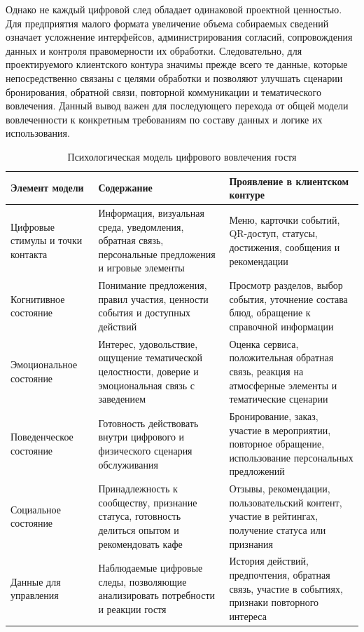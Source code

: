 Однако не каждый цифровой след обладает одинаковой проектной ценностью. Для предприятия малого формата увеличение объема собираемых сведений означает усложнение интерфейсов, администрирования согласий, сопровождения данных и контроля правомерности их обработки. Следовательно, для проектируемого клиентского контура значимы прежде всего те данные, которые непосредственно связаны с целями обработки и позволяют улучшать сценарии бронирования, обратной связи, повторной коммуникации и тематического вовлечения. Данный вывод важен для последующего перехода от общей модели вовлеченности к конкретным требованиям по составу данных и логике их использования.

\begin{table}[H]
\centering
\small
\caption{Психологическая модель цифрового вовлечения гостя}
\label{tab:psychological_engagement_model}
\begin{tabularx}{\textwidth}{|>{\raggedright\arraybackslash}p{}|>{\raggedright\arraybackslash}p{}|>{\raggedright\arraybackslash}X|}
\hline
\textbf{Элемент модели} & \textbf{Содержание} & \textbf{Проявление в клиентском контуре} \\ \hline
Цифровые стимулы и точки контакта & Информация, визуальная среда, уведомления, обратная связь, персональные предложения и игровые элементы & Меню, карточки событий, QR-доступ, статусы, достижения, сообщения и рекомендации \\ \hline
Когнитивное состояние & Понимание предложения, правил участия, ценности события и доступных действий & Просмотр разделов, выбор события, уточнение состава блюд, обращение к справочной информации \\ \hline
Эмоциональное состояние & Интерес, удовольствие, ощущение тематической целостности, доверие и эмоциональная связь с заведением & Оценка сервиса, положительная обратная связь, реакция на атмосферные элементы и тематические сценарии \\ \hline
Поведенческое состояние & Готовность действовать внутри цифрового и физического сценария обслуживания & Бронирование, заказ, участие в мероприятии, повторное обращение, использование персональных предложений \\ \hline
Социальное состояние & Принадлежность к сообществу, признание статуса, готовность делиться опытом и рекомендовать кафе & Отзывы, рекомендации, пользовательский контент, участие в рейтингах, получение статуса или признания \\ \hline
Данные для управления & Наблюдаемые цифровые следы, позволяющие анализировать потребности и реакции гостя & История действий, предпочтения, обратная связь, участие в событиях, признаки повторного интереса \\ \hline
\end{tabularx}
\normalsize
\end{table}

